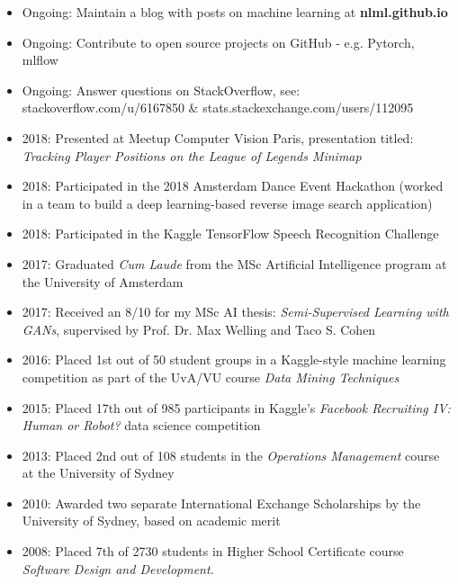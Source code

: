 \documentclass[margin]{res}
\begin{document}
\begin{resume}
		\begin{itemize}
			\item Ongoing: Maintain a blog with posts on machine learning at \textbf{nlml.github.io}
			\item Ongoing: Contribute to open source projects on GitHub - e.g. Pytorch, mlflow
			\item Ongoing: Answer questions on StackOverflow, see:\\stackoverflow.com/u/6167850 \& stats.stackexchange.com/users/112095
			\item 2018: Presented at Meetup Computer Vision Paris, presentation titled:\\ \emph{Tracking Player Positions on the League of Legends Minimap}
			\item 2018: Participated in the 2018 Amsterdam Dance Event Hackathon (worked in a team to build a deep learning-based reverse image search application)
			\item 2018: Participated in the Kaggle TensorFlow Speech Recognition Challenge
			\item 2017: Graduated {\it Cum Laude} from the MSc Artificial Intelligence program at the University of Amsterdam
			\item 2017: Received an 8/10 for my MSc AI thesis: {\it Semi-Supervised Learning with GANs}, supervised by Prof. Dr. Max Welling and Taco S. Cohen
			\item 2016: Placed 1st out of 50 student groups in a Kaggle-style machine learning competition as part of the UvA/VU course \textit{Data Mining Techniques}
			\item 2015: Placed 17th out of 985 participants in Kaggle's {\sl Facebook Recruiting IV: Human or Robot?} data science competition
			\item 2013: Placed 2nd out of 108 students in the \textit{Operations Management} course at the University of Sydney
			\item 2010: Awarded two separate International Exchange Scholarships by the University of Sydney, based on academic merit
			\item 2008: Placed 7th of 2730 students in Higher School Certificate course {\sl Software Design and Development.}
		\end{itemize}
		

\end{resume}
\end{document}
